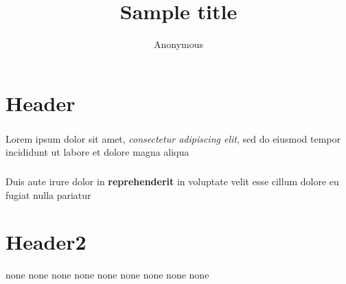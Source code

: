 \documentclass{beamer}
\title{Sample title}
\author{Anonymous}
\begin{document}
\section{Header}
\begin{frame}
\frametitle{\insertsection}
Lorem ipsum dolor sit amet, \emph{consectetur adipiscing elit}, sed do eiusmod  tempor incididunt ut labore et dolore magna aliqua
\end{frame}
\begin{frame}
\frametitle{\insertsection}
Duis aute irure dolor in \textbf{reprehenderit} in voluptate  velit esse cillum dolore eu fugiat nulla pariatur
\end{frame}
\section{Header2}
none
none
none
none
none
none
none
none
none
\end{document}
